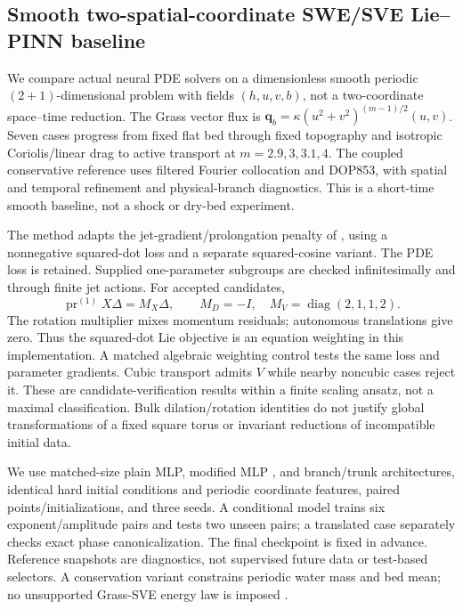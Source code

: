 \subsection{Smooth two-spatial-coordinate SWE/SVE Lie--PINN baseline}
We compare actual neural PDE solvers on a dimensionless smooth periodic
$(2+1)$-dimensional problem with fields $(h,u,v,b)$, not a two-coordinate
space--time reduction. The Grass vector flux is
$\boldsymbol q_b=\kappa(u^2+v^2)^{(m-1)/2}(u,v)$.
Seven cases progress from fixed flat bed through fixed topography and
isotropic Coriolis/linear drag to active transport at $m=2.9,3,3.1,4$.
The coupled conservative reference uses filtered Fourier collocation and
DOP853, with spatial and temporal refinement and physical-branch diagnostics.
This is a short-time smooth baseline, not a shock or dry-bed experiment.

The method adapts the jet-gradient/prolongation penalty of
\cite{akhound2023liepinn}, using a nonnegative squared-dot loss and a separate
squared-cosine variant. The PDE loss is retained. Supplied one-parameter
subgroups are checked infinitesimally and through finite jet actions. For
accepted candidates,
\[
 \operatorname{pr}^{(1)}X\Delta=M_X\Delta,
 \qquad M_D=-I,\quad M_V=\operatorname{diag}(2,1,1,2).
\]
The rotation multiplier mixes momentum residuals; autonomous translations
give zero. Thus the squared-dot Lie objective is an equation weighting in
this implementation. A matched algebraic weighting control tests the same
loss and parameter gradients. Cubic transport admits $V$ while nearby
noncubic cases reject it. These are candidate-verification results within a
finite scaling ansatz, not a maximal classification. Bulk dilation/rotation
identities do not justify global transformations of a fixed square torus or
invariant reductions of incompatible initial data.

We use matched-size plain MLP, modified MLP \cite{wang2021gradient}, and
branch/trunk architectures, identical hard initial conditions and periodic
coordinate features, paired points/initializations, and three seeds. A
conditional model trains six exponent/amplitude pairs and tests two unseen
pairs; a translated case separately checks exact phase canonicalization.
The final checkpoint is fixed in advance. Reference snapshots are diagnostics,
not supervised future data or test-based selectors. A conservation variant
constrains periodic water mass and bed mean; no unsupported Grass-SVE energy
law is imposed \cite{fernandez2017sve}.

